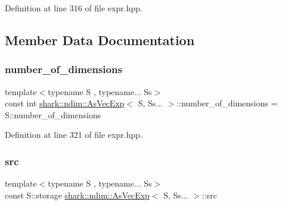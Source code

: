 Definition at line 316 of file expr.\+hpp.



\subsection{Member Data Documentation}
\hypertarget{classshark_1_1ndim_1_1_as_vec_exp_3_01_s_00_01_ss_8_8_8_01_4_a203536498ce354b29804db9ba83a3c99}{}\label{classshark_1_1ndim_1_1_as_vec_exp_3_01_s_00_01_ss_8_8_8_01_4_a203536498ce354b29804db9ba83a3c99} 
\subsubsection{\texorpdfstring{number\+\_\+of\+\_\+dimensions}{number\_of\_dimensions}}
{\footnotesize\ttfamily template$<$typename S , typename... Ss$>$ \\
const int \hyperlink{classshark_1_1ndim_1_1_as_vec_exp}{shark\+::ndim\+::\+As\+Vec\+Exp}$<$ S, Ss... $>$\+::number\+\_\+of\+\_\+dimensions = S\+::number\+\_\+of\+\_\+dimensions\hspace{0.3cm}{\ttfamily [static]}}



Definition at line 321 of file expr.\+hpp.

\hypertarget{classshark_1_1ndim_1_1_as_vec_exp_3_01_s_00_01_ss_8_8_8_01_4_a194abf424b594c3e86a42aa114700e51}{}\label{classshark_1_1ndim_1_1_as_vec_exp_3_01_s_00_01_ss_8_8_8_01_4_a194abf424b594c3e86a42aa114700e51} 
\subsubsection{\texorpdfstring{src}{src}}
{\footnotesize\ttfamily template$<$typename S , typename... Ss$>$ \\
const S\+::storage \hyperlink{classshark_1_1ndim_1_1_as_vec_exp}{shark\+::ndim\+::\+As\+Vec\+Exp}$<$ S, Ss... $>$\+::src\hspace{0.3cm}{\ttfamily [private]}}



